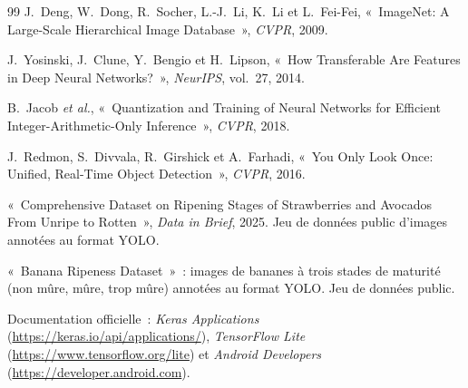 \begin{thebibliography}{99}
 J.~Deng, W.~Dong, R.~Socher, L.-J.~Li, K.~Li et L.~Fei-Fei, «~ImageNet: A Large-Scale Hierarchical Image Database~», \emph{CVPR}, 2009.

 J.~Yosinski, J.~Clune, Y.~Bengio et H.~Lipson, «~How Transferable Are Features in Deep Neural Networks?~», \emph{NeurIPS}, vol.~27, 2014.

 B.~Jacob \emph{et al.}, «~Quantization and Training of Neural Networks for Efficient Integer-Arithmetic-Only Inference~», \emph{CVPR}, 2018.

 J.~Redmon, S.~Divvala, R.~Girshick et A.~Farhadi, «~You Only Look Once: Unified, Real-Time Object Detection~», \emph{CVPR}, 2016.

 «~Comprehensive Dataset on Ripening Stages of Strawberries and Avocados From Unripe to Rotten~», \emph{Data in Brief}, 2025. Jeu de données public d’images annotées au format YOLO.

 «~Banana Ripeness Dataset~»~: images de bananes à trois stades de maturité (non mûre, mûre, trop mûre) annotées au format YOLO. Jeu de données public.

 Documentation officielle~: \emph{Keras Applications} (\url{https://keras.io/api/applications/}), \emph{TensorFlow Lite} (\url{https://www.tensorflow.org/lite}) et \emph{Android Developers} (\url{https://developer.android.com}).

\end{thebibliography}
